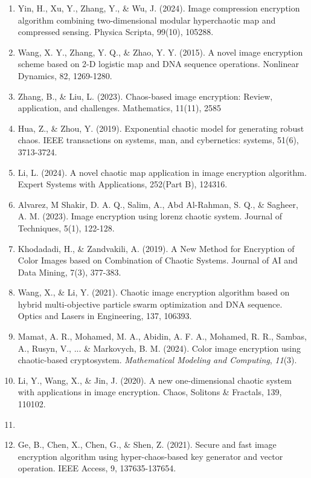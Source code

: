 \begin{enumerate}
\def\labelenumi{\arabic{enumi}.}
\item
  Yin, H., Xu, Y., Zhang, Y., \& Wu, J. (2024). Image compression encryption algorithm combining two-dimensional modular hyperchaotic map and compressed sensing. Physica Scripta, 99(10), 105288.
\item
  Wang, X. Y., Zhang, Y. Q., \& Zhao, Y. Y. (2015). A novel image encryption scheme based on 2-D logistic map and DNA sequence operations. Nonlinear Dynamics, 82, 1269-1280.
\item
  Zhang, B., \& Liu, L. (2023). Chaos-based image encryption: Review, application, and challenges. Mathematics, 11(11), 2585
\item
  Hua, Z., \& Zhou, Y. (2019). Exponential chaotic model for generating robust chaos. IEEE transactions on systems, man, and cybernetics: systems, 51(6), 3713-3724.
\item
  Li, L. (2024). A novel chaotic map application in image encryption algorithm. Expert Systems with Applications, 252(Part B), 124316.
\item
  Alvarez, M Shakir, D. A. Q., Salim, A., Abd Al-Rahman, S. Q., \& Sagheer, A. M. (2023). Image encryption using lorenz chaotic system. Journal of Techniques, 5(1), 122-128.
\item
  Khodadadi, H., \& Zandvakili, A. (2019). A New Method for Encryption of Color Images based on Combination of Chaotic Systems. Journal of AI and Data Mining, 7(3), 377-383.
\item
  Wang, X., \& Li, Y. (2021). Chaotic image encryption algorithm based on hybrid multi-objective particle swarm optimization and DNA sequence. Optics and Lasers in Engineering, 137, 106393.
\item
  Mamat, A. R., Mohamed, M. A., Abidin, A. F. A., Mohamed, R. R., Sambas, A., Rusyn, V., ... \& Markovych, B. M. (2024). Color image encryption using chaotic-based cryptosystem. \emph{Mathematical Modeling and Computing}, \emph{11}(3).
\item
  Li, Y., \RL{}Wang, X., \& Jin, J. (2020). A new one-dimensional chaotic system with applications in image encryption. Chaos, Solitons \& Fractals, 139, 110102.
\item
\item
  Ge, B., Chen, X., Chen, G., \& Shen, Z. (2021). Secure and fast image encryption algorithm using hyper-chaos-based key generator and vector operation. IEEE Access, 9, 137635-137654.

\end{enumerate}
